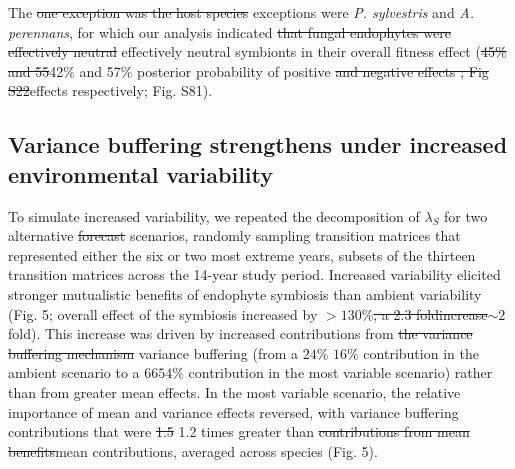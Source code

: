 \documentclass[lineno, sn-basic]{sn-jnl}%
\providecommand{\DIFadd}[1]{{\protect\color{blue}#1}} %
\providecommand{\DIFdel}[1]{{\protect\color{red}\protect\scriptsize\sout{#1}}}
\providecommand{\DIFadd}[1]{{\protect\color{blue}\uwave{#1}}} %
\providecommand{\DIFdel}[1]{{\protect\color{red}\sout{#1}}}                      %
\providecommand{\DIFaddbegin}{} %
\providecommand{\DIFaddend}{} %
\providecommand{\DIFdelbegin}{} %
\providecommand{\DIFdelend}{} %
\newcommand{\DIFscaledelfig}{0.5}
\newlength{\DIFdelgraphicswidth} %
\newlength{\DIFdelgraphicsheight} %
\newcommand{\DIFaddincludegraphics}[2][]{{\color{blue}\fbox{\DIFOincludegraphics[#1]{#2}}}} %
\newcommand{\DIFdelincludegraphics}[2][]{%
\sbox{\DIFdelgraphicsbox}{\DIFOincludegraphics[#1]{#2}}%
\settoboxwidth{\DIFdelgraphicswidth}{\DIFdelgraphicsbox} %
\settoboxtotalheight{\DIFdelgraphicsheight}{\DIFdelgraphicsbox} %
\scalebox{\DIFscaledelfig}{%
\parbox[b]{\DIFdelgraphicswidth}{\usebox{\DIFdelgraphicsbox}\\[-\baselineskip] \rule{\DIFdelgraphicswidth}{0em}}\llap{\resizebox{\DIFdelgraphicswidth}{\DIFdelgraphicsheight}{%
\setlength{\unitlength}{\DIFdelgraphicswidth}%
\begin{picture}(1,1)%
\thicklines\linethickness{2pt} %
{\color[rgb]{1,0,0}\put(0,0){\framebox(1,1){}}}%
{\color[rgb]{1,0,0}\put(0,0){\line( 1,1){1}}}%
{\color[rgb]{1,0,0}\put(0,1){\line(1,-1){1}}}%
\end{picture}%
}\hspace*{3pt}}} %
} %
\DeclareRobustCommand{\DIFaddbegin}{\DIFOaddbegin \let\includegraphics\DIFaddincludegraphics} %
\DeclareRobustCommand{\DIFaddend}{\DIFOaddend \let\includegraphics\DIFOincludegraphics} %
\DeclareRobustCommand{\DIFdelbegin}{\DIFOdelbegin \let\includegraphics\DIFdelincludegraphics} %
\DeclareRobustCommand{\DIFdelend}{\DIFOaddend \let\includegraphics\DIFOincludegraphics} %
\begin{document}
The \DIFdelbegin \DIFdel{one exception was the host species }\DIFdelend \DIFaddbegin \DIFadd{exceptions were }\DIFaddend \emph{P. sylvestris} \DIFaddbegin \DIFadd{and }\emph{\DIFadd{A. perennans}}\DIFaddend , for which our analysis indicated \DIFdelbegin \DIFdel{that fungal endophytes were effectively neutral }\DIFdelend \DIFaddbegin \DIFadd{effectively neutral symbionts }\DIFaddend in their overall fitness effect (\DIFdelbegin \DIFdel{45\% and 55}\DIFdelend \DIFaddbegin \DIFadd{42\% and 57}\DIFaddend \% posterior probability of positive \DIFdelbegin \DIFdel{and negative effects ; Fig S22}\DIFdelend \DIFaddbegin \DIFadd{effects respectively; Fig. S81}\DIFaddend ). 

\subsection*{Variance buffering strengthens under increased environmental variability}
To simulate increased variability, we repeated the decomposition of $\lambda_{S}$ for two alternative \DIFdelbegin \DIFdel{forecast }\DIFdelend scenarios, randomly sampling transition matrices that represented either the six or two most extreme years, subsets of the thirteen transition matrices across the 14-year study period. 
Increased variability elicited stronger mutualistic benefits of endophyte symbiosis than ambient variability (Fig. 5; overall effect of the symbiosis increased by \DIFdelbegin \DIFdel{$>130\%$, a 2.3 foldincrease}\DIFdelend \DIFaddbegin \DIFadd{$\sim{2}$fold}\DIFaddend ).
This increase was driven by increased contributions from \DIFdelbegin \DIFdel{the variance buffering mechanism }\DIFdelend \DIFaddbegin \DIFadd{variance buffering }\DIFaddend (from a \DIFdelbegin \DIFdel{$24\%$ }\DIFdelend \DIFaddbegin \DIFadd{$16\%$ }\DIFaddend contribution in the ambient scenario to a \DIFdelbegin \DIFdel{$66$}\DIFdelend \DIFaddbegin \DIFadd{$54$}\DIFaddend \% contribution in the most variable scenario) rather than from greater mean effects.
In the most variable scenario, the relative importance of mean and variance effects reversed, with variance buffering contributions that were \DIFdelbegin \DIFdel{1.5 }\DIFdelend \DIFaddbegin \DIFadd{1.2 }\DIFaddend times greater than \DIFdelbegin \DIFdel{contributions from mean benefits}\DIFdelend \DIFaddbegin \DIFadd{mean contributions}\DIFaddend , averaged across species (Fig. 5). 
\end{document}
